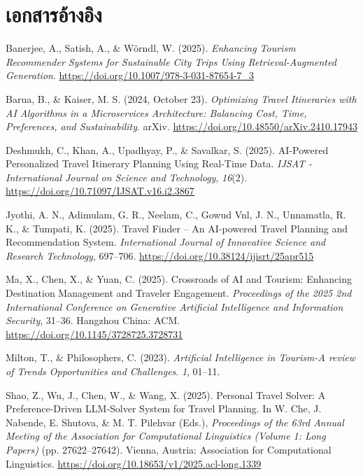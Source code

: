\section{เอกสารอ้างอิง}

\begin{list}{}{\setlength{\leftmargin}{1.2cm}\setlength{\itemindent}{-1.2cm}\setlength{\itemsep}{8pt}}

\item Banerjee, A., Satish, A., \& Wörndl, W. (2025). \textit{Enhancing Tourism Recommender Systems for Sustainable City Trips Using Retrieval-Augmented Generation}. \url{https://doi.org/10.1007/978-3-031-87654-7_3}

\item Barua, B., \& Kaiser, M. S. (2024, October 23). \textit{Optimizing Travel Itineraries with AI Algorithms in a Microservices Architecture: Balancing Cost, Time, Preferences, and Sustainability}. arXiv. \url{https://doi.org/10.48550/arXiv.2410.17943}

\item Deshmukh, C., Khan, A., Upadhyay, P., \& Savalkar, S. (2025). AI-Powered Personalized Travel Itinerary Planning Using Real-Time Data. \textit{IJSAT - International Journal on Science and Technology}, \textit{16}(2). \url{https://doi.org/10.71097/IJSAT.v16.i2.3867}

\item Jyothi, A. N., Adimulam, G. R., Neelam, C., Gowud Vnl, J. N., Unnamatla, R. K., \& Tumpati, K. (2025). Travel Finder -- An AI-powered Travel Planning and Recommendation System. \textit{International Journal of Innovative Science and Research Technology}, 697--706. \url{https://doi.org/10.38124/ijisrt/25apr515}

\item Ma, X., Chen, X., \& Yuan, C. (2025). Crossroads of AI and Tourism: Enhancing Destination Management and Traveler Engagement. \textit{Proceedings of the 2025 2nd International Conference on Generative Artificial Intelligence and Information Security}, 31--36. Hangzhou China: ACM. \url{https://doi.org/10.1145/3728725.3728731}

\item Milton, T., \& Philosophers, C. (2023). \textit{Artificial Intelligence in Tourism-A review of Trends Opportunities and Challenges}. \textit{1}, 01--11.

\item Shao, Z., Wu, J., Chen, W., \& Wang, X. (2025). Personal Travel Solver: A Preference-Driven LLM-Solver System for Travel Planning. In W. Che, J. Nabende, E. Shutova, \& M. T. Pilehvar (Eds.), \textit{Proceedings of the 63rd Annual Meeting of the Association for Computational Linguistics (Volume 1: Long Papers)} (pp. 27622--27642). Vienna, Austria: Association for Computational Linguistics. \url{https://doi.org/10.18653/v1/2025.acl-long.1339}


\end{list}
